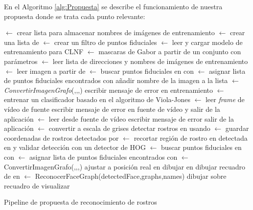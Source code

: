 En el Algoritmo \ref{alg:Propuesta} se describe el funcionamiento de nuestra propuesta donde se trata cada punto relevante:
\begin{algorithm}
 $\gets$ crear lista para almacenar nombres de imágenes de entrenamiento\;
 $\gets$ crear una lista de \;
 $\gets$ crear un filtro de puntos fiduciales\;
 $\gets$ leer y cargar modelo de entrenamiento para \ac{CLNF}\;
 $\gets$ mascaras de Gabor a partir de un conjunto con parámetros\;
 $\gets$ leer lista de direcciones y nombres de imágenes de entrenamiento\;
{
	 $\gets$ leer imagen a partir de \;
     $\gets$ buscar puntos fiduciales en  con \;
    {
    	 $\gets$ asignar lista de puntos fiduciales encontrados con \;
        añadir nombre de la imagen a la lista \;
        $\gets$\textit{ConvertirImagenGrafo}(,,,)\;
    }
    {
    	escribir mensaje de error en entrenamiento\;
    }
}
 $\gets$ entrenar un clasificador basado en el algoritmo de Viola-Jones\;
 $\gets$ leer \textit{frame} de vídeo de fuente\;
{
	escribir mensaje de error en fuente de vídeo y salir de la aplicación\;
}
{
	 $\gets$ leer desde fuente de vídeo\;
    {
    	escribir mensaje de error\;
        salir de la aplicación\;
    }
     $\gets$ convertir  a escala de grises\;
    detectar rostros en  usando \;
     $\gets$ guardar coordenadas de rostros detectados por \;
    {
    	 $\gets$ recortar región de rostro en detectada en  y validar detección con un detector de \ac{HOG}\;
         $\gets$ buscar puntos fiduciales en  con \;
    }
    {
    	 $\gets$ asignar lista de puntos fiduciales encontrados con \;
         $\gets$ ConvertirImagenGrafo(,,,)\;
    }
    ajustar  a posición real en \;
    dibujar  en \;
    dibujar recuadro de  en \;
     $\gets$ ReconocerFaceGraph(detectedFace,graphs,names)\;
    dibujar  sobre recuadro de \;
    visualizar \;
}
\caption{Pipeline de propuesta de reconocimiento de rostros}
\label{alg:Propuesta}
\end{algorithm}


